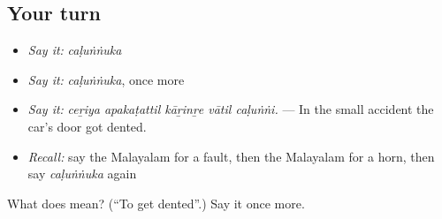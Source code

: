 \subsection*{Your turn}
\begin{itemize}
\raggedright
  \item \emph{Say it:} \emph{caḷuṅṅuka}
  \item \emph{Say it:} \emph{caḷuṅṅuka}, once more
  \item \emph{Say it:} \emph{ceṟiya apakaṭattil kāṟinṟe vātil caḷuṅṅi.} — In the small accident the car's door got dented.
  \item \emph{Recall:} say the Malayalam for a fault, then the Malayalam for a horn, then say \emph{caḷuṅṅuka} again
\end{itemize}

\begin{tcolorbox}[breakable,colback=teal!4,colframe=teal!35!black,title={Before you move on}]
What does  mean? (\textquotedblleft{}To get dented\textquotedblright{}.) Say it once more.
\end{tcolorbox}
